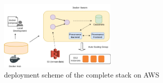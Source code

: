 \begin{figure}[H]
	\center
	\includegraphics[width=0.5\textwidth]{figures/deployment2.png}
	\caption{deployment scheme of the complete stack on AWS}
	\label{fig:finaldeployment}
\end{figure}